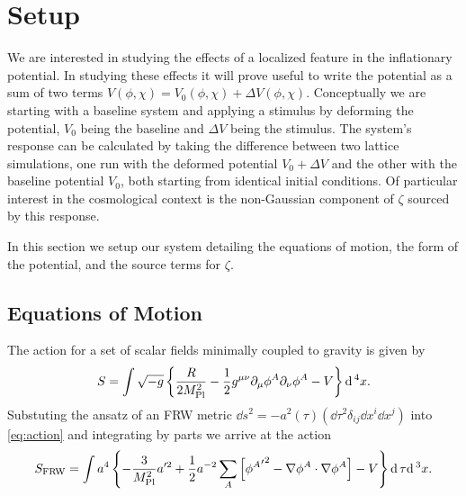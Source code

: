 
\section{Setup} \label{sec:setup}
We are interested in studying the effects of a localized feature in the inflationary potential.
In studying these effects it will prove useful to write the potential as a sum of two terms $V(\phi,\chi) = V_0(\phi,\chi) + \Delta V(\phi,\chi)$.
Conceptually we are starting with a baseline system and applying a stimulus by deforming the potential, $V_0$ being the baseline and $\Delta V$ being the stimulus.
The system's response can be calculated by taking the difference between two lattice simulations, one run with the deformed potential $V_0+\Delta V$ and the other with the baseline potential $V_0$, both starting from identical initial conditions.
Of particular interest in the cosmological context is the non-Gaussian component of $\zeta$ sourced by this response.

In this section we setup our system detailing the equations of motion, the form of the potential, and the source terms for $\zeta$.

\subsection{Equations of Motion}

The action for a set of scalar fields minimally coupled to gravity is given by
\begin{equation} \label{eq:action}
  S = \int \sqrt{-g}\left\{\frac{R}{2M_{\mathrm{Pl}}^2} - \frac{1}{2}g^{\mu\nu}\partial_\mu\phi^A\partial_\nu\phi^A - V \right\}\mathrm{d}\,^4x.
\end{equation} 
Substuting the ansatz of an FRW metric $\dd s^2 = -a^2(\tau)\left( \dd\tau^2 \delta_{ij}\dd x^i\dd x^j \right)$ into \eqref{eq:action} and integrating by parts we arrive at the action
\begin{equation} \label{eq:actionFRW}
  S_{\mathrm{FRW}} = \int a^4\left\{
  - \frac{3}{M_{\mathrm{Pl}}^2}a'^2
  + \frac{1}{2}a^{-2}\sum_A\left[{{\phi^A}'}^2
  - \nabla\phi^A\cdot\nabla\phi^A\right]
  - V
  \right\}\mathrm{d}\,\tau\mathrm{d}\,^3x.
\end{equation}

